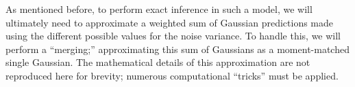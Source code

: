 \documentclass{article}
\newcommand{\given}{\ensuremath{\mid}}
\newcommand{\cm}[1]{\ensuremath{\mathcal{#1}}}
\newcommand{\bm}[1]{\ensuremath{\mathbf{#1}}}
\newcommand{\data}{\ensuremath{\cm{D}}}
\newcommand{\vect}[1]{\bm{#1}}
\newcommand{\vs}{\vect{\sigma}}
\newcommand{\amean}[2]{\tilde{{m}}(#1 \given #2 )}
\newcommand{\acov}[2]{\tilde{{C}}(#1 \given #2 )}
\newcommand{\p}[2]{p(#1\given#2)}
\newcommand{\fPr}{p}
\newcommand{\Prob}[2]{\fPr(#1 \given #2 )}
\newcommand{\st}{_{\star}}
\newcommand{\tr}{\ensuremath{\mathsf{T}}}
\DeclareMathOperator{\chol}{chol}
\begin{document}
As mentioned before, to perform exact inference in such a model, we
will ultimately need to approximate a weighted sum of Gaussian
predictions made using the different possible values for the noise
variance.  To handle this, we will perform a ``merging;''
approximating this sum of Gaussians as a moment-matched single
Gaussian.  The mathematical details of this approximation are not
reproduced here for brevity; numerous computational ``tricks'' must be
applied.

\end{document}
